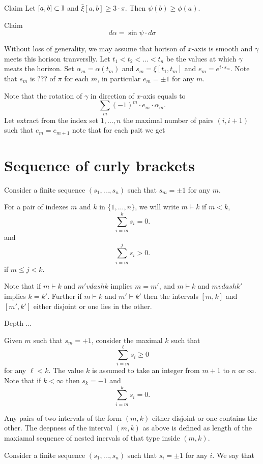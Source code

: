\documentclass[a4paper,10pt]{amsart}
\begin{document}
\begin{thm}{Claim}
Let $[a,b]\subset\mathbb{I}$ and $\bar\xi[a,b]\ge 3\cdot\pi$.
Then $\psi(b)\ge \phi(a)$.
\end{thm}


\begin{thm}{Claim}
\[d\alpha= \sin \psi \cdot d\sigma\] 
\end{thm}

Without loss of generality, we may assume that horison of $x$-axis is smooth and $\gamma$ meets this horison tranverslly.
Let $t_1<t_2<\dots<t_n$
be the values at which $\gamma$ meats the horizon.
Set $\alpha_m=\alpha(t_m)$ and $s_m=\xi[t_1,t_m]$ and $e_m=e^{i\cdot s_m}$.
Note that $s_m$ is ??? of $\pi$ for each $m$,
in particular $e_m=\pm1$ for any $m$.

Note that the rotation of $\gamma$ in direction of $x$-axis equals to 
\[\sum_m (-1)^m\cdot e_m\cdot\alpha_m.\]
Let extract from the index set $1,\dots,n$
the maximal number of pairs $(i,i+1)$
such that $e_m=e_{m+1}$ note that for each pait we get

\section{Sequence of curly brackets}

Consider a finite sequence $(s_1,\dots,s_n)$ such that $s_m=\pm1$ for any $m$.

For a pair of indexes $m$ and $k$ in $\{1,\dots,n\}$,
we will write $m\vdash k$ if $m<k$,
\[\sum_{i=m}^k s_i= 0.\]
and
\[\sum_{i=m}^j s_i>0.\]
if $m\le j<k$.

Note that if $m\vdash k$ and $m'vdash k$ implies $m=m'$,
and $m\vdash k$ and $mvdash k'$ implies $k=k'$.
Further if $m\vdash k$ and $m'\vdash k'$ then the intervals $[m,k]$ and $[m',k']$ either disjoint or one lies in the other.

Depth ...


Given $m$ such that $s_m=+1$, 
consider the maximal $k$ such that
\[\sum_{i=m}^\ell s_i\ge 0\]
for any $\ell<k$.
The value $k$ is assumed to take an integer from $m+1$ to $n$ or $\infty$.
Note that if $k<\infty$ then $s_k=-1$ and 
\[\sum_{i=m}^k s_i= 0.\]

Any pairs of two intervals of the form $(m,k)$ either disjoint or 
one contains the other.
The deepness of the interval $(m,k)$ as above is defined as length of the maxiamal sequence of nested inervals of that type inside $(m,k)$.



Consider a finite sequence $(s_1,\dots,s_n)$ such that $s_i=\pm1$ for any $i$.
We say that 
\end{document}
